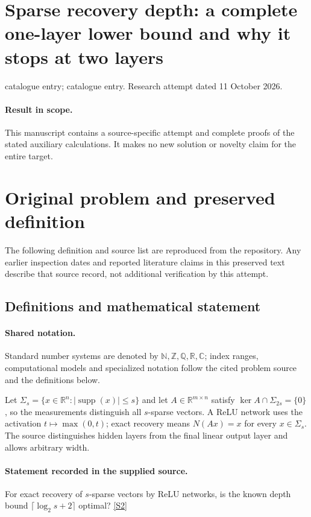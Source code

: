 \documentclass[11pt]{article}
\begin{document}
\section*{Sparse recovery depth: a complete one-layer lower bound and why it stops at two layers}
\noindent catalogue entry; catalogue entry. Research attempt dated 11 October 2026.
\paragraph{Result in scope.}This manuscript contains a source-specific attempt and complete proofs of the stated auxiliary calculations. It makes no new solution or novelty claim for the entire target.
\section{Original problem and preserved definition}
The following definition and source list are reproduced from the repository. Any earlier inspection dates and reported literature claims in this preserved text describe that source record, not additional verification by this attempt.
\subsection{Definitions and mathematical statement}

\paragraph{Shared notation.}Standard number systems are denoted by $\mathbb N,\mathbb Z,\mathbb Q,\mathbb R,\mathbb C$; index ranges, computational models and specialized notation follow the cited problem source and the definitions below.


Let $\Sigma_s=\{x\in\mathbb R^n:|\operatorname{supp}(x)|\leq s\}$ and let $A\in\mathbb R^{m\times n}$ satisfy $\ker A\cap\Sigma_{2s}=\{0\}$, so the measurements distinguish all $s$-sparse vectors. A ReLU network uses the activation $t\mapsto\max(0,t)$; exact recovery means $N(Ax)=x$ for every $x\in\Sigma_s$. The source distinguishes hidden layers from the final linear output layer and allows arbitrary width.
\paragraph{Statement recorded in the supplied source.}
For exact recovery of $s$-sparse vectors by ReLU networks, is the known depth bound $\lceil\log_2s+2\rceil$ optimal? \href{https://doi.org/10.4171/owr/2021/55}{[S2]}
\end{document}
